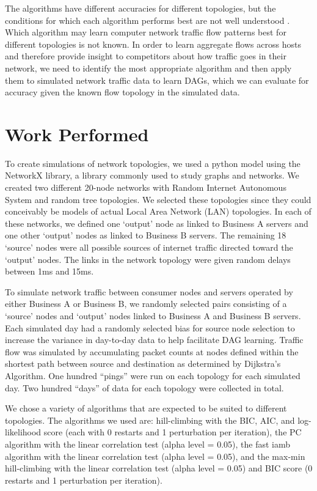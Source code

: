 \documentclass[conference]{IEEEtran}
\begin{document}
The algorithms have different accuracies for different topologies, but the conditions for which each algorithm performs best are not well understood \cite{b11}. Which algorithm may learn computer network traffic flow patterns best for different topologies is not known. In order to learn aggregate flows across hosts and therefore provide insight to competitors about how traffic goes in their network, we need to identify the most appropriate algorithm and then apply them to simulated network traffic data to learn DAGs, which we can evaluate for accuracy given the known flow topology in the simulated data.


\section{Work Performed}

To create simulations of network topologies, we used a python model using the NetworkX library, a library commonly used to study graphs and networks. We created two different 20-node networks with Random Internet Autonomous System and random tree topologies. We selected these topologies since they could conceivably be models of actual Local Area Network (LAN) topologies. In each of these networks, we defined one ‘output’ node as linked to Business A servers and one other ‘output’ nodes as linked to Business B servers. The remaining 18 ‘source’ nodes were all possible sources of internet traffic directed toward the ‘output’ nodes. The links in the network topology were given random delays between 1ms and 15ms.

To simulate network traffic between consumer nodes and servers operated by either Business A or Business B, we randomly selected pairs consisting of a ‘source’ nodes and ‘output’ nodes linked to Business A and Business B servers. Each simulated day had a randomly selected bias for source node selection to increase the variance in day-to-day data to help facilitate DAG learning. Traffic flow was simulated by accumulating packet counts at nodes defined within the shortest path between source and destination as determined by Dijkstra’s Algorithm. One hundred “pings” were run on each topology for each simulated day. Two hundred “days” of data for each topology were collected in total.

We chose a variety of algorithms that are expected to be suited to different topologies. The algorithms we used are: hill-climbing with the BIC, AIC, and log-likelihood score (each with 0 restarts and 1 perturbation per iteration), the PC algorithm with the linear correlation test (alpha level = 0.05), the fast iamb algorithm with the linear correlation test (alpha level = 0.05), and the max-min hill-climbing with the linear correlation test (alpha level = 0.05) and BIC score (0 restarts and 1 perturbation per iteration).
\end{document}
